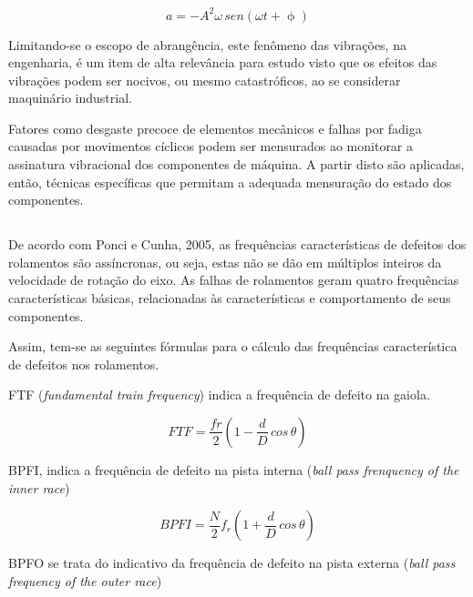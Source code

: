 \documentclass[
	12pt,				
	oneside,			
	a4paper,			
	english,			
	brazil,			
	]{abntex2ppgsi}
\begin{document}
\begin{equation}
	a = -A^{2} \omega \,sen (\omega t + \upphi)
	\label{eq: Equação de Aceleração}
\end{equation}

Limitando-se o escopo de abrangência, este fenômeno das vibrações, na engenharia, é um item de alta relevância para estudo visto que os efeitos das vibrações podem ser nocivos, ou mesmo catastróficos, ao se considerar maquinário industrial. 

Fatores como desgaste precoce de elementos mecânicos e falhas por fadiga causadas por movimentos cíclicos podem ser mensurados ao monitorar a assinatura vibracional dos componentes de máquina. A partir disto são aplicadas, então, técnicas específicas que permitam a adequada mensuração do estado dos componentes. 

\subsection{}
\label{secao:frequenciasCaracteristicas}

De acordo com Ponci e Cunha, 2005, as frequências características de defeitos dos rolamentos são assíncronas, ou seja, estas não se dão em múltiplos inteiros da velocidade de rotação do eixo. As falhas de rolamentos geram quatro frequências características básicas, relacionadas às características e comportamento de seus componentes. 


Assim, tem-se as seguintes fórmulas para o cálculo das frequências característica de defeitos nos rolamentos.

FTF (\textit{fundamental train frequency}) indica a frequência de defeito na gaiola.

\begin{equation}
	FTF = \frac{fr}{2} \left ( 1 - \frac{d}{D} \,cos \, \theta \right ) 
	\label{eq: FTF}
\end{equation}

BPFI, indica a frequência de defeito na pista interna (\textit{ball pass frenquency of the inner race})

\begin{equation}
	BPFI = \frac{N}{2}f_{r} \left ( 1 + \frac{d}{D} \,cos \, \theta \right ) 
	\label{eq: BPFI}
\end{equation}

BPFO se trata do indicativo da frequência de defeito na pista externa (\textit{ball pass frequency of the outer race})
\end{document}
